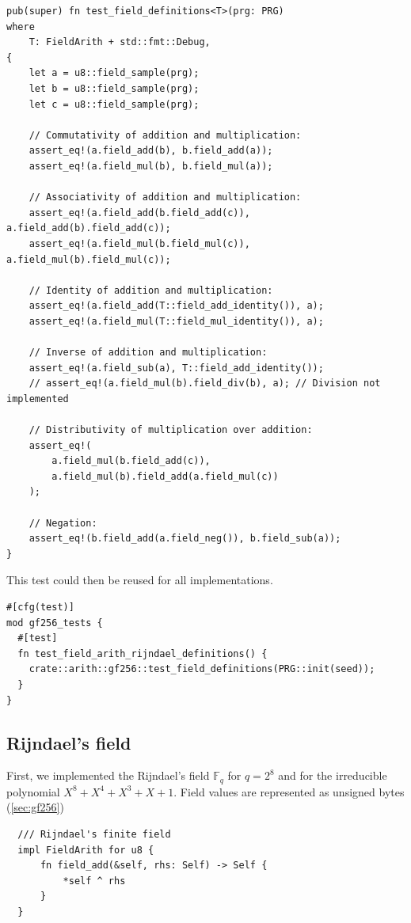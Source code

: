 \documentclass[11pt]{report}
\theoremstyle{definition}
\theoremstyle{plain}
\begin{document}
\begin{verbatim}
pub(super) fn test_field_definitions<T>(prg: PRG)
where
    T: FieldArith + std::fmt::Debug,
{
    let a = u8::field_sample(prg);
    let b = u8::field_sample(prg);
    let c = u8::field_sample(prg);

    // Commutativity of addition and multiplication:
    assert_eq!(a.field_add(b), b.field_add(a));
    assert_eq!(a.field_mul(b), b.field_mul(a));

    // Associativity of addition and multiplication:
    assert_eq!(a.field_add(b.field_add(c)), a.field_add(b).field_add(c));
    assert_eq!(a.field_mul(b.field_mul(c)), a.field_mul(b).field_mul(c));

    // Identity of addition and multiplication:
    assert_eq!(a.field_add(T::field_add_identity()), a);
    assert_eq!(a.field_mul(T::field_mul_identity()), a);

    // Inverse of addition and multiplication:
    assert_eq!(a.field_sub(a), T::field_add_identity());
    // assert_eq!(a.field_mul(b).field_div(b), a); // Division not implemented

    // Distributivity of multiplication over addition:
    assert_eq!(
        a.field_mul(b.field_add(c)),
        a.field_mul(b).field_add(a.field_mul(c))
    );

    // Negation:
    assert_eq!(b.field_add(a.field_neg()), b.field_sub(a));
}
\end{verbatim}

This test could then be reused for all  implementations.

\begin{verbatim}
#[cfg(test)]
mod gf256_tests {
  #[test]
  fn test_field_arith_rijndael_definitions() {
    crate::arith::gf256::test_field_definitions(PRG::init(seed));
  }
}
\end{verbatim}

\subsection{Rijndael's field}\label{sub:rijndael_field}

First, we implemented the Rijndael's field $\mathbb{F}_{q}$ for $q=2^8$ and for the irreducible polynomial $X^8 + X^4 + X^3 + X + 1$. Field values are represented as unsigned bytes  (\autoref{sec:gf256})
\begin{verbatim}
  /// Rijndael's finite field 
  impl FieldArith for u8 {
      fn field_add(&self, rhs: Self) -> Self {
          *self ^ rhs
      }
  }
\end{verbatim}
\end{document}
